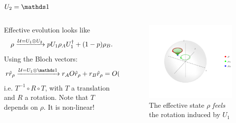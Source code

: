 \begin{frame}{$U_{2}=\Id$}
\begin{columns}
    \begin{column}{0.5\textwidth}
        Effective evolution looks like
        \begin{equation*}
            \rho\xrightarrow{\mathcal{U}=U_{1}\otimes U_{2}} pU_{1}\rho_{A}U_{1}^{\dag}+(1-p)\rho_{B}.
        \end{equation*}
        Using the Bloch vectors:
        \begin{equation*}
            r\hat{r}_{\rho}\xrightarrow{\mcU=U_{1}\otimes \Id}r_{A}O\hat{r}_{\rho}+r_{B}\hat{r}_{\rho}=O(r\hat{r}_{\rho}-r_{B}\hat{r}_{\rho})+r_{B}\hat{r}_{\rho}
        \end{equation*}
        i.e. $T^{-1}\circ R\circ T$, with $T$ a translation and $R$ a rotation. Note that $T$ depends on $\rho$. It is non-linear!
    \end{column}
    \begin{column}{0.5\textwidth}
        \begin{figure}[h!]
            \includegraphics[width=0.8\linewidth]{../notes/log/maxent/figures/U1xU2_H1=sz_H2=Id_z=0.9_p=0.4_sequence.png}
            \caption{The effective state $\rho$ \textit{feels} the rotation induced by $U_{1}$}
            \label{fig:ZRot}
        \end{figure}
    \end{column}
\end{columns}
\end{frame}


